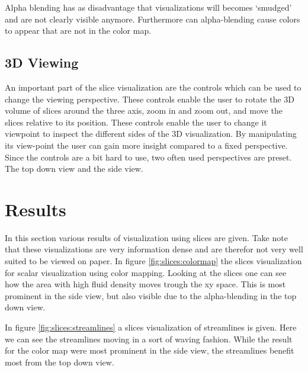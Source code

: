 Alpha blending has as disadvantage that visualizations will becomes `smudged' and are not clearly visible anymore. Furthermore can alpha-blending cause colors to appear that are not in the color map.

\subsection{3D Viewing} %
\label{sub:3d_controls}
An important part of the slice visualization are the controls which can be used to change the viewing perspective. These controls enable the user to rotate the 3D volume of slices around the three axis, zoom in and zoom out, and move the slices relative to its position. These controls enable the user to change it viewpoint to inspect the different sides of the 3D visualization. By manipulating its view-point the user can gain more insight compared to a fixed perspective. Since the controls are a bit hard to use, two often used perspectives are preset. The top down view and the side view. 

\section{Results} %
\label{sec:results}
In this section various results of visualization using slices are given. Take note that these visualizations are very information dense and are therefor not very well suited to be viewed on paper. In figure \ref{fig:slices:colormap} the slices visualization for scalar visualization using color mapping. Looking at the slices one can see how the area with high fluid density moves trough the xy space. This is most prominent in the side view, but also visible due to the alpha-blending in the top down view.

In figure \ref{fig:slices:streamlines} a slices visualization of streamlines is given. Here we can see the streamlines moving in a sort of waving fashion. While the result for the color map were most prominent in the side view, the streamlines benefit most from the top down view.

